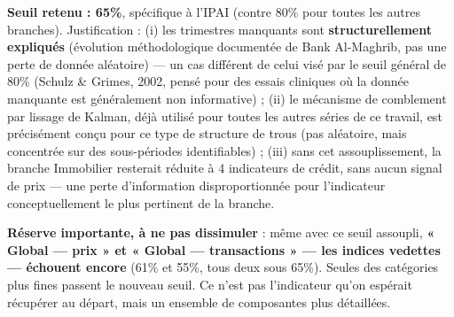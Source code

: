 \documentclass[11pt,a4paper]{article}
\begin{document}
\begin{fichebox}
\textbf{Seuil retenu : 65\%}, spécifique à l'IPAI (contre 80\% pour toutes les autres branches). Justification : (i) les trimestres manquants sont \textbf{structurellement expliqués} (évolution méthodologique documentée de Bank Al-Maghrib, pas une perte de donnée aléatoire) --- un cas différent de celui visé par le seuil général de 80\% (Schulz \& Grimes, 2002, pensé pour des essais cliniques où la donnée manquante est généralement non informative) ; (ii) le mécanisme de comblement par lissage de Kalman, déjà utilisé pour toutes les autres séries de ce travail, est précisément conçu pour ce type de structure de trous (pas aléatoire, mais concentrée sur des sous-périodes identifiables) ; (iii) sans cet assouplissement, la branche Immobilier resterait réduite à 4 indicateurs de crédit, sans aucun signal de prix --- une perte d'information disproportionnée pour l'indicateur conceptuellement le plus pertinent de la branche.
\end{fichebox}

\begin{alertebox}
\textbf{Réserve importante, à ne pas dissimuler} : même avec ce seuil assoupli, \textbf{« Global — prix » et « Global — transactions » --- les indices vedettes --- échouent encore} (61\% et 55\%, tous deux sous 65\%). Seules des catégories plus fines passent le nouveau seuil. Ce n'est pas l'indicateur qu'on espérait récupérer au départ, mais un ensemble de composantes plus détaillées.
\end{alertebox}
\end{document}
